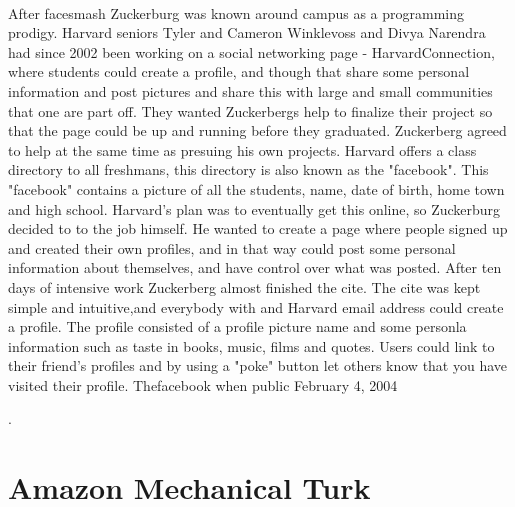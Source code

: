 \paragraph{}
After facesmash Zuckerburg was known around campus as a programming prodigy. Harvard seniors Tyler and Cameron Winklevoss and Divya Narendra had since 2002 been working on a social networking page - HarvardConnection, where students could create a profile, and though that share some personal information and post pictures and share this with large and small communities that one are part off. They wanted Zuckerbergs help to finalize their project so that the page could be up and running before they graduated. Zuckerberg agreed to help at the same time as presuing his own projects. Harvard offers a class directory to all freshmans, this directory is also known as the "facebook". This "facebook" contains a picture of all the students, name, date of birth, home town and high school. Harvard's plan was to eventually get this online, so Zuckerburg decided to to the job himself. He wanted to create a page where people signed up and created their own profiles, and in that way could post some personal information about themselves, and have control over what was posted. After ten days of intensive work Zuckerberg almost finished the cite. The cite was kept simple and intuitive,and everybody with and Harvard email address could create a profile. The profile consisted of a profile picture name and some personla information such as taste in books, music, films and quotes. Users could link to their friend's profiles and by using a "poke" button let others know that you have visited their profile.  Thefacebook when public February 4, 2004 




\cite{FacebookHistory}.


\section{Amazon Mechanical Turk}


